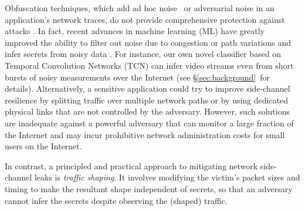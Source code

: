 Obfuscation techniques, which add ad hoc noise~\cite{luo2011httpos}
or adversarial noise \cite{shan2021dolos, nasr2021defeating, rahman2020mockingbird,
hou2020wf, abusnaina2020dfd, gong2022surakav}
in an application's network traces, do not provide comprehensive protection
against {\nsca} attacks \cite{zhang2019statistical}.
In fact, recent advances in machine learning (ML)
have greatly improved the ability to filter
out noise due to congestion or path variations and infer secrets from noisy data
\cite{schuster2017beautyburst, bhat2019varcnn, hayes2016kfp, sirinam2018df}. For
instance, our own novel classifier based on Temporal Convolution
Networks (TCN) \cite{bai2018tcn} can infer video streams even from short bursts
of noisy
measurements over the Internet (see \S\ref{sec:background}~for details).
Alternatively, a sensitive application could try to improve side-channel
resilience by splitting traffic over multiple network paths
\cite{cadena2020trafficsliver, wang2022leveraging} or by
using dedicated physical links that are not controlled by the adversary.
However, such solutions are inadequate against a powerful adversary
that can monitor a large fraction of the Internet
\cite{beckerle2022splitting} and may incur prohibitive network
administration costs for small users on the Internet.


In contrast, a principled and practical approach to mitigating network
side-channel leaks is {\em traffic shaping}. It involves modifying the victim’s
packet sizes and timing to make the resultant shape independent of secrets, so
that an adversary cannot infer the secrets despite observing the (shaped)
traffic.

